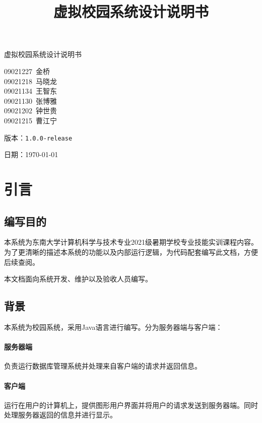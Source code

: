 \documentclass{article}
\title{虚拟校园系统设计说明书}
\begin{document}
\begin{titlepage}
\vspace*{\fill}

\begin{center}
    {\Huge 虚拟校园系统设计说明书}

    \vspace{10cm}
{\large
09021227~金\phantom{金}桥 \\
09021218~马晓龙 \\
09021134~王智东 \\
09021130~张博雅 \\
09021202~钟世贵 \\
09021215~曹江宁
}

    \vspace{0.5cm}
    {\large 版本：\texttt{1.0.0-release}}

    
\vspace{0.5cm}


    {\large 日期：\today}
\end{center}

\vspace*{\fill}
\end{titlepage}
\tableofcontents
\newpage

\section{引言}
\subsection{编写目的}

本系统为东南大学计算机科学与技术专业2021级暑期学校专业技能实训课程内容。为了更清晰的描述本系统的功能以及内部运行逻辑，为代码配套编写此文档，方便后续查阅。

本文档面向系统开发、维护以及验收人员编写。

\subsection{背景}

本系统为校园系统，采用Java语言进行编写。分为服务器端与客户端：

\paragraph{服务器端}
负责运行数据库管理系统并处理来自客户端的请求并返回信息。

\paragraph{客户端}
运行在用户的计算机上，提供图形用户界面并将用户的请求发送到服务器端。同时处理服务器返回的信息并进行显示。
\end{document}

